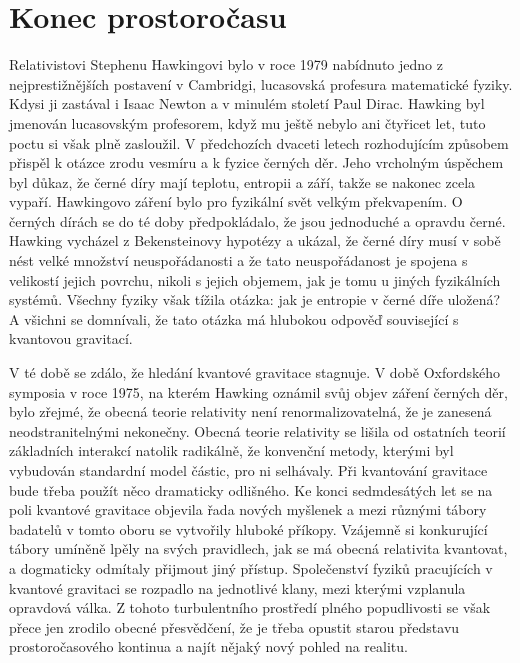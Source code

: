 \section{Konec prostoročasu}\label{feyIchIIIsecXIII}
  Relativistovi Stephenu Hawkingovi bylo v roce 1979 nabídnuto jedno z nejprestižnějších postavení v
  Cambridgi, lucasovská profesura matematické fyziky. Kdysi ji zastával i Isaac Newton a v minulém
  století Paul Dirac. Hawking byl jmenován lucasovským profesorem, když mu ještě nebylo ani čtyřicet
  let, tuto poctu si však plně zasloužil. V předchozích dvaceti letech rozhodujícím způsobem přispěl
  k otázce zrodu vesmíru a k fyzice černých děr. Jeho vrcholným úspěchem byl důkaz, že černé díry
  mají teplotu, entropii a září, takže se nakonec zcela vypaří. Hawkingovo záření bylo pro fyzikální
  svět velkým překvapením. O černých dírách se do té doby předpokládalo, že jsou jednoduché a
  opravdu černé. Hawking vycházel z Bekensteinovy hypotézy a ukázal, že černé díry musí v sobě nést
  velké množství neuspořádanosti a že tato neuspořádanost je spojena s velikostí jejich povrchu,
  nikoli s jejich objemem, jak je tomu u jiných fyzikálních systémů. Všechny fyziky však tížila
  otázka: jak je entropie v černé díře uložená? A všichni se domnívali, že tato otázka má hlubokou
  odpověď související s kvantovou gravitací. 
  
  V té době se zdálo, že hledání kvantové gravitace stagnuje. V době Oxfordského symposia v roce
  1975, na kterém Hawking oznámil svůj objev záření černých děr, bylo zřejmé, že obecná teorie
  relativity není renormalizovatelná, že je zanesená neodstranitelnými nekonečny. Obecná teorie
  relativity se lišila od ostatních teorií základních interakcí natolik radikálně, že konvenční
  metody, kterými byl vybudován standardní model částic, pro ni selhávaly. Při kvantování gravitace
  bude třeba použít něco dramaticky odlišného. Ke konci sedmdesátých let se na poli kvantové
  gravitace objevila řada nových myšlenek a mezi různými tábory badatelů v tomto oboru se vytvořily
  hluboké příkopy. Vzájemně si konkurující tábory umíněně lpěly na svých pravidlech, jak se má
  obecná relativita kvantovat, a dogmaticky odmítaly přijmout jiný přístup. Společenství fyziků
  pracujících v kvantové gravitaci se rozpadlo na jednotlivé klany, mezi kterými vzplanula opravdová
  válka. Z tohoto turbulentního prostředí plného popudlivosti se však přece jen zrodilo obecné
  přesvědčení, že je třeba opustit starou představu prostoročasového kontinua a najít nějaký nový
  pohled na realitu. 
  
